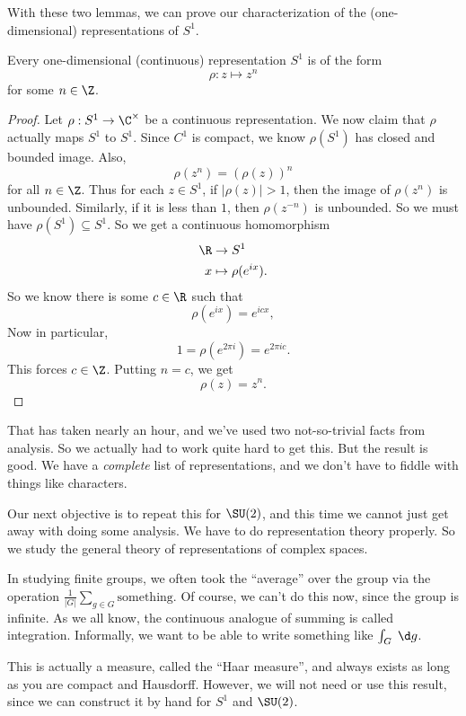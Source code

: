 \documentclass[a4paper]{article}
\begin{document}
With these two lemmas, we can prove our characterization of the (one-dimensional) representations of $S^1$.
\begin{thm}
  Every one-dimensional (continuous) representation $S^1$ is of the form
  \[
    \rho: z \mapsto z^n
  \]
  for some $n \in \Z$.
\end{thm}

\begin{proof}
  Let $\rho: S^1 \to \C^\times$ be a continuous representation. We now claim that $\rho$ actually maps $S^1$ to $S^1$. Since $C^1$ is compact, we know $\rho(S^1)$ has closed and bounded image. Also,
  \[
    \rho(z^n) = (\rho(z))^n
  \]
  for all $n \in \Z$. Thus for each $z \in S^1$, if $|\rho(z)| > 1$, then the image of $\rho(z^n)$ is unbounded. Similarly, if it is less than $1$, then $\rho(z^{-n})$ is unbounded. So we must have $\rho(S^1) \subseteq S^1$. So we get a continuous homomorphism
  \begin{align*}
    \R &\to S^1\\
    x &\mapsto \rho(e^{ix}).
  \end{align*}
  So we know there is some $c \in \R$ such that
  \[
    \rho(e^{ix}) = e^{icx},
  \]
  Now in particular,
  \[
    1 = \rho(e^{2 \pi i}) = e^{2\pi i c}.
  \]
  This forces $c \in \Z$. Putting $n = c$, we get
  \[
    \rho(z) = z^n.
  \]
\end{proof}
That has taken nearly an hour, and we've used two not-so-trivial facts from analysis. So we actually had to work quite hard to get this. But the result is good. We have a \emph{complete} list of representations, and we don't have to fiddle with things like characters.

Our next objective is to repeat this for $\SU(2)$, and this time we cannot just get away with doing some analysis. We have to do representation theory properly. So we study the general theory of representations of complex spaces.

In studying finite groups, we often took the ``average'' over the group via the operation $\frac{1}{|G|} \sum_{g \in G}\text{something}$. Of course, we can't do this now, since the group is infinite. As we all know, the continuous analogue of summing is called integration. Informally, we want to be able to write something like $\int_G \;\d g$.

This is actually a measure, called the ``Haar measure'', and always exists as long as you are compact and Hausdorff. However, we will not need or use this result, since we can construct it by hand for $S^1$ and $\SU(2)$.
\end{document}
